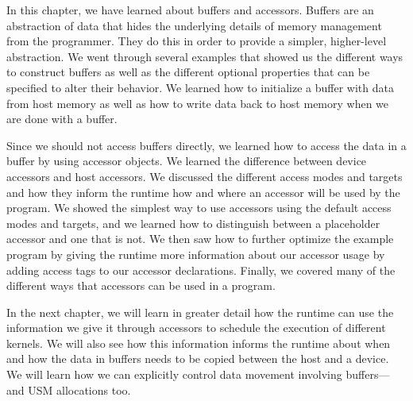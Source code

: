 In this chapter, we have learned about buffers and accessors. Buffers are an abstraction of data that hides the underlying details of memory management from the programmer. They do this in order to provide a simpler, higher-level abstraction. We went through several examples that showed us the different ways to construct buffers as well as the different optional properties that can be specified to alter their behavior. We learned how to initialize a buffer with data from host memory as well as how to write data back to host memory when we are done with a buffer.\par

Since we should not access buffers directly, we learned how to access the data in a buffer by using accessor objects. We learned the difference between device accessors and host accessors. We discussed the different access modes and targets and how they inform the runtime how and where an accessor will be used by the program. We showed the simplest way to use accessors using the default access modes and targets, and we learned how to distinguish between a placeholder accessor and one that is not. We then saw how to further optimize the example program by giving the runtime more information about our accessor usage by adding access tags to our accessor declarations. Finally, we covered many of the different ways that accessors can be used in a program.\par

In the next chapter, we will learn in greater detail how the runtime can use the information we give it through accessors to schedule the execution of different kernels. We will also see how this information informs the runtime about when and how the data in buffers needs to be copied between the host and a device. We will learn how we can explicitly control data movement involving buffers—and USM allocations too.\par

\newpage